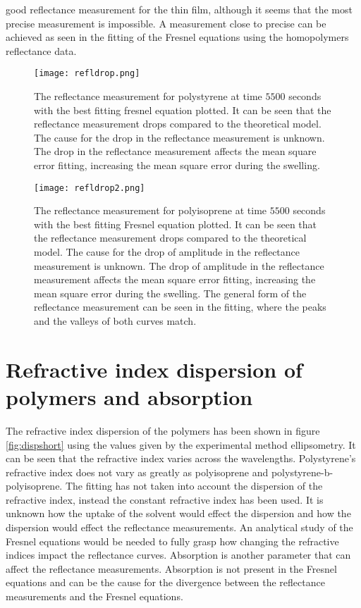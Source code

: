 \documentclass[MasterThesisMain.tex]{subfiles}
\begin{document}
good reflectance measurement for the thin film, although it seems that the most precise measurement is impossible. A measurement close to precise can be achieved as seen in the fitting of the Fresnel equations using the homopolymers reflectance data.

\begin{figure}[H]
\centering
\texttt{[image: refldrop.png]}
\caption{The reflectance measurement for polystyrene at time $5500$ seconds with the best fitting fresnel equation plotted. It can be seen that the reflectance measurement drops compared to the theoretical model. The cause for the drop in the reflectance measurement is unknown. The drop in the reflectance measurement affects the mean square error fitting, increasing the mean square error during the swelling.}
\label{fig:drop}
\end{figure}

\begin{figure}[H]
\centering
\texttt{[image: refldrop2.png]}
\caption{The reflectance measurement for polyisoprene at time $5500$ seconds with the best fitting Fresnel equation plotted. It can be seen that the reflectance measurement drops compared to the theoretical model. The cause for the drop of amplitude in the reflectance measurement is unknown. The drop of amplitude in the reflectance measurement affects the mean square error fitting, increasing the mean square error during the swelling. The general form of the reflectance measurement can be seen in the fitting, where the peaks and the valleys of both curves match.}
\label{fig:drop2}
\end{figure}

\section{Refractive index dispersion of polymers and absorption}
The refractive index dispersion of the polymers has been shown in figure \ref{fig:dispshort} using the values given by the experimental method ellipsometry. It can be seen that the refractive index varies across the wavelengths. Polystyrene's refractive index does not vary as greatly as polyisoprene and polystyrene-b-polyisoprene. The fitting has not taken into account the dispersion of the refractive index, instead the constant refractive index has been used. It is unknown how the uptake of the solvent would effect the dispersion and how the dispersion would effect the reflectance measurements. An analytical study of the Fresnel equations would be needed to fully grasp how changing the refractive indices impact the reflectance curves. Absorption is another parameter that can affect the reflectance measurements. Absorption is not present in the Fresnel equations and can be the cause for the divergence between the reflectance measurements and the Fresnel equations. 
\end{document}
